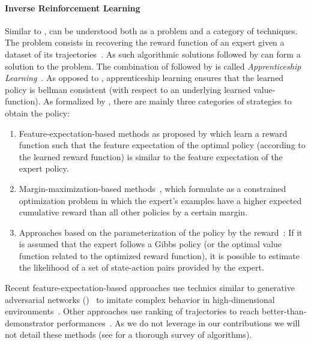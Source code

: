 \paragraph{Inverse Reinforcement Learning}

Similar to \rl, \irl can be understood both as a problem and a category of techniques. The \irl problem consists in recovering the reward function of an expert given a dataset of its trajectories~\citep{ng2000irl}. As such \irl algorithmic solutions followed by \rl can form a solution to the \il problem. The combination of \irl followed by \rl is called \textit{Apprenticeship Learning}~\citep{abbeel2004apprenticeship}. As opposed to \bc, apprenticeship learning ensures that the learned policy is bellman consistent (with respect to an underlying learned value-function). As formalized by \citet{klein2011apprenticeship}, there are mainly three categories of strategies to obtain the policy:
\begin{enumerate}[noitemsep]
\item Feature-expectation-based methods as proposed by \citet{ziebart2008maxentirl} which learn a reward function such that the feature expectation of the optimal policy (according to the learned reward function) is similar to the feature expectation of the expert policy. 
\item Margin-maximization-based methods~\citep{ratlif2006maxmargin}, which formulate \irl as a constrained optimization problem in which the expert's examples have a higher expected cumulative reward than all other policies by a certain margin.
\item Approaches based on the parameterization of the policy by the reward~\citep{neu2007apprenticeship}: If it is assumed that the expert follows a Gibbs policy (or the optimal value function related to the optimized reward function), it is possible to estimate the likelihood of a set of state-action pairs provided by the expert.
\end{enumerate}
%
Recent feature-expectation-based approaches use technics similar to generative adversarial networks (\gan)~\citep{goodfellow2014generative} to imitate complex behavior in high-dimensional environments~\citep{ho2016gail}. Other approaches use ranking of trajectories to reach better-than-demonstrator performances~\citep{brown2020better}. As we do not leverage \irl in our contributions we will not detail these methods (see \citet{arora_survey_2021} for a thorough survey of \irl algorithms).



